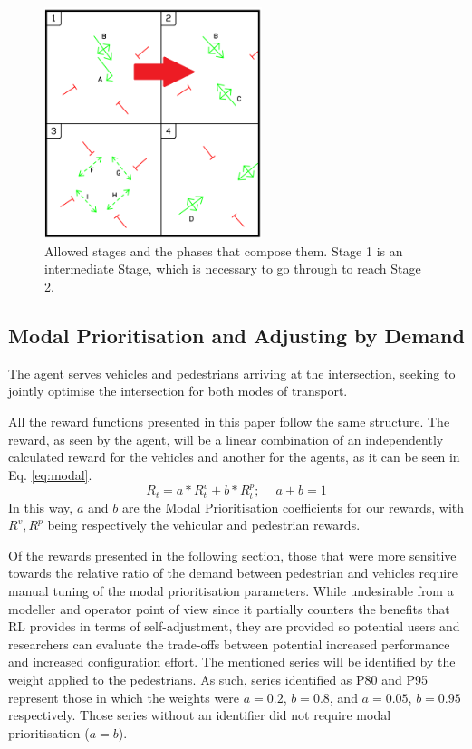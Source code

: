 \documentclass[conference]{IEEEtran}
\begin{document}
\begin{figure}                                                
\centering                                                    
\includegraphics[width=2.5in]{phases_limited.png}                                    
\caption{Allowed stages and the phases that compose them. Stage 1 is an intermediate Stage, which is necessary to go through to reach Stage 2.}                                  
\label{intersection_phases}  
                                            
\end{figure}     
\subsection{Modal Prioritisation and Adjusting by Demand}
The agent serves vehicles and pedestrians arriving at the intersection, seeking to jointly optimise the intersection for both modes of transport.

All the reward functions presented in this paper follow the same structure.
The reward, as seen by the agent, will be a linear combination of an independently calculated reward for the vehicles and another for the agents, as it can be seen in Eq. \ref{eq:modal}.
\begin{equation}
R_t = a * R^v_t + b * R^p_t;\,\,\,\,\,\,\ a+b = 1
\label{eq:modal}
\end{equation}
In this way, $a$ and $b$ are the Modal Prioritisation coefficients for our rewards, with $R^v, R^p$ being respectively the vehicular and pedestrian rewards.

Of the rewards presented in the following section, those that were more sensitive towards the relative ratio of the demand between pedestrian and vehicles require manual tuning of the modal prioritisation parameters.
While undesirable from a modeller and operator point of view since it partially counters the benefits that RL provides in terms of self-adjustment, they are provided so potential users and researchers can evaluate the trade-offs between potential increased performance and increased configuration effort.
The mentioned series will be identified by the weight applied to the pedestrians.
As such, series identified as P80 and P95 represent those in which the weights were $a=0.2$, $b=0.8$, and $a=0.05$, $b=0.95$ respectively. 
Those series without an identifier did not require modal prioritisation ($a = b$).
\end{document}
